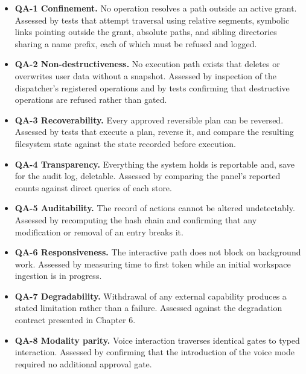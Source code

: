 \documentclass{FastFyp}
\begin{document}
\begin{itemize}
    \item \textbf{QA-1 Confinement.} No operation resolves a path outside an active grant. Assessed by tests that attempt traversal using relative segments, symbolic links pointing outside the grant, absolute paths, and sibling directories sharing a name prefix, each of which must be refused and logged.
    \item \textbf{QA-2 Non-destructiveness.} No execution path exists that deletes or overwrites user data without a snapshot. Assessed by inspection of the dispatcher's registered operations and by tests confirming that destructive operations are refused rather than gated.
    \item \textbf{QA-3 Recoverability.} Every approved reversible plan can be reversed. Assessed by tests that execute a plan, reverse it, and compare the resulting filesystem state against the state recorded before execution.
    \item \textbf{QA-4 Transparency.} Everything the system holds is reportable and, save for the audit log, deletable. Assessed by comparing the panel's reported counts against direct queries of each store.
    \item \textbf{QA-5 Auditability.} The record of actions cannot be altered undetectably. Assessed by recomputing the hash chain and confirming that any modification or removal of an entry breaks it.
    \item \textbf{QA-6 Responsiveness.} The interactive path does not block on background work. Assessed by measuring time to first token while an initial workspace ingestion is in progress.
    \item \textbf{QA-7 Degradability.} Withdrawal of any external capability produces a stated limitation rather than a failure. Assessed against the degradation contract presented in Chapter 6.
    \item \textbf{QA-8 Modality parity.} Voice interaction traverses identical gates to typed interaction. Assessed by confirming that the introduction of the voice mode required no additional approval gate.
\end{itemize}
\end{document}
